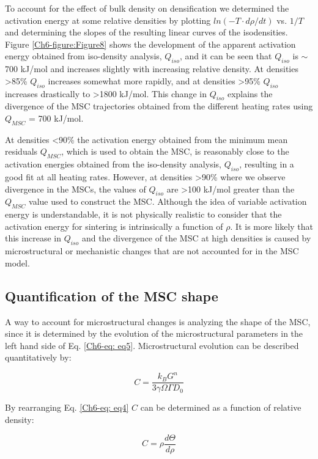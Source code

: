 To account for the effect of bulk density on densification we determined the activation energy at some relative densities by plotting $ln(-T·d\rho/dt)$ vs. $1/T$ and determining the slopes of the resulting linear curves of the isodensities. Figure \ref{Ch6-figure:Figure8} shows the development of the apparent activation energy obtained from iso-density analysis, $Q_{iso}$, and it can be seen that $Q_{iso}$ is $\sim$700 kJ/mol and increases slightly with increasing relative density. At densities >85\% $Q_{iso}$ increases somewhat more rapidly, and at densities >95\% $Q_{iso}$ increases drastically to >1800 kJ/mol. This change in $Q_{iso}$ explains the divergence of the MSC trajectories obtained from the different heating rates using $Q_{MSC}$ = 700 kJ/mol. 

At densities <90\% the activation energy obtained from the minimum mean residuals $Q_{MSC}$, which is used to obtain the MSC, is reasonably close to the activation energies obtained from the iso-density analysis, $Q_{iso}$, resulting in a good fit at all heating rates. However, at densities >90\% where we observe divergence in the MSCs, the values of $Q_{iso}$ are >100 kJ/mol greater than the $Q_{MSC}$ value used to construct the MSC. Although the idea of variable activation energy is understandable, it is not physically realistic to consider that the activation energy for sintering is intrinsically a function of $\rho$. It is more likely that this increase in $Q_{iso}$ and the divergence of the MSC at high densities is caused by microstructural or mechanistic changes that are not accounted for in the MSC model. 

\subsection{Quantification of the MSC shape}
A way to account for microstructural changes is analyzing the shape of the MSC, since it is determined by the evolution of the microstructural parameters in the left hand side of Eq. \ref{Ch6-eq: eq5}. Microstructural evolution can be described quantitatively by:

\begin{equation}
\label{Ch6-eq: eq7}
C = \frac{k_{B} G^{n}}{3 \gamma \Omega \Gamma D_{0}} 
\end{equation}

\noindent By rearranging Eq. \ref{Ch6-eq: eq4} $C$ can be determined as a function of relative density:

\begin{equation}
\label{Ch6-eq: eq8}
C = \rho \frac{d\Theta}{d \rho} 
\end{equation}

